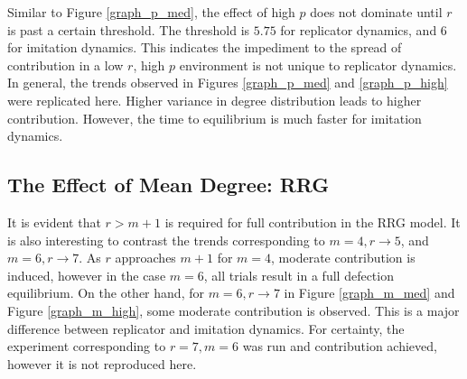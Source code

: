 \FloatBarrier

 Similar to Figure \ref{graph_p_med}, the effect of high $p$ does not dominate until $r$ is past a certain threshold. The threshold is $5.75$ for replicator dynamics, and $6$ for imitation dynamics. This indicates the impediment to the spread of contribution in a low $r$, high $p$ environment is not unique to replicator dynamics. \\
 
 In general, the trends observed in Figures \ref{graph_p_med} and \ref{graph_p_high} were replicated here. Higher variance in degree distribution leads to higher contribution. However, the time to equilibrium is much faster for imitation dynamics.
 
\subsection{The Effect of Mean Degree: RRG}

 \FloatBarrier

 \FloatBarrier



 \FloatBarrier

It is evident that $r>m+1$ is required for full contribution in the RRG model. It is also interesting  to contrast the trends corresponding to $m=4, r \to 5$, and $m=6, r \to 7$. As $r$ approaches $m+1$ for $m=4$, moderate contribution is induced, however in the case $m=6$, all trials result in a full defection equilibrium. On the other hand, for $m = 6, r \to 7$ in Figure \ref{graph_m_med} and Figure \ref{graph_m_high}, some moderate contribution is observed. This is a major difference between replicator and imitation dynamics. For certainty, the experiment corresponding to $r=7, m =6$ was run and contribution achieved, however it is not reproduced here. 


